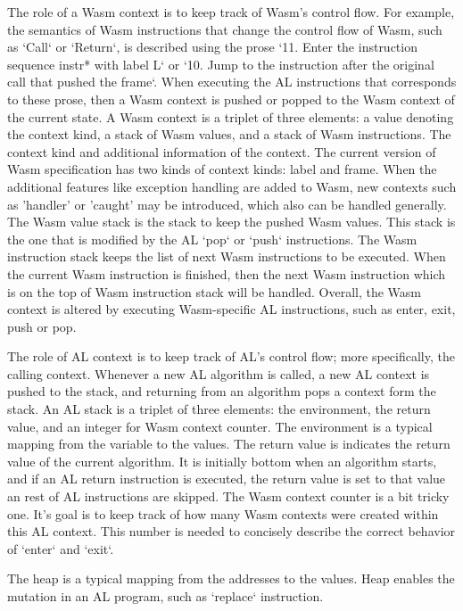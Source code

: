 The role of a Wasm context is to keep track of Wasm's control flow. For example,
the semantics of Wasm instructions that change the control flow of Wasm, such as `Call` or `Return`,
is described using the prose
`11. Enter the instruction sequence instr* with label L` or
`10. Jump to the instruction after the original call that pushed the frame`.
When executing the AL instructions that corresponds to these prose, then a Wasm context is
pushed or popped to the Wasm context of the current state.
A Wasm context is a triplet of three elements: a value denoting the context kind, a stack of Wasm values,
and a stack of Wasm instructions. The context kind and additional information of the context.
The current version of Wasm specification has two kinds of context kinds: label and frame.
When the additional features like exception handling are added to Wasm, new contexts such as
'handler' or 'caught' may be introduced, which also can be handled generally.
The Wasm value stack is the stack to keep the pushed Wasm values. This stack is the one that is
modified by the AL `pop` or `push` instructions. The Wasm instruction stack keeps the list of
next Wasm instructions to be executed. When the current Wasm instruction is finished, then
the next Wasm instruction which is on the top of Wasm instruction stack will be handled.
Overall, the Wasm context is altered by executing Wasm-specific AL instructions,
such as enter, exit, push or pop.

The role of AL context is to keep track of AL's control flow; more specifically, the calling context.
Whenever a new AL algorithm is called, a new AL context is pushed to the stack, and returning from
an algorithm pops a context form the stack. An AL stack is a triplet of three elements:
the environment, the return value, and an integer for Wasm context counter.
The environment is a typical mapping from the variable to the values. The return value is
indicates the return value of the current algorithm. It is initially bottom when an algorithm starts,
and if an AL return instruction is executed, the return value is set to that value an rest of
AL instructions are skipped. The Wasm context counter is a bit tricky one. It's goal is to
keep track of how many Wasm contexts were created within this AL context. This number is
needed to concisely describe the correct behavior of `enter` and `exit`.

The heap is a typical mapping from the addresses to the values. Heap enables the mutation
in an AL program, such as `replace` instruction.

